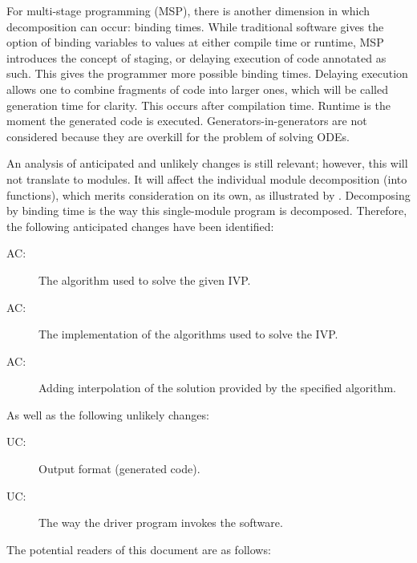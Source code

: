\documentclass[12pt, titlepage]{article}
\newcounter{acnum}
\newcommand{\actheacnum}{AC\theacnum}
\newcounter{ucnum}
\newcommand{\uctheucnum}{UC\theucnum}
\begin{document}
For multi-stage programming (MSP), there is another dimension in which 
decomposition can occur: binding times. While traditional software gives the 
option of binding variables to values at either compile time or runtime, MSP 
introduces the concept of staging, or delaying execution of code annotated as 
such. This gives the programmer more possible binding times. Delaying execution 
allows one to combine fragments of code into larger ones, which will be called 
generation time for clarity. This occurs after compilation time. Runtime is the 
moment the generated code is executed. Generators-in-generators are not 
considered because they are overkill for the problem of solving ODEs. 

An analysis of anticipated and unlikely changes is still relevant; however, 
this will not translate to modules. It will affect the individual module 
decomposition (into functions), which merits consideration on its 
own, as illustrated by \cite{VanHilst:1996:DCD:250707.239109}. Decomposing by 
binding time is the way this single-module program is decomposed. Therefore, 
the following anticipated changes have been identified:
\begin{description}
  \item[ \actheacnum \label{acAlgorithm}:] The algorithm 
  used to solve the given IVP.
  \item[ \actheacnum \label{acImplementation}:] The 
  implementation of the algorithms used to solve the IVP.
  \item [ \actheacnum \label{acInterpolation}:] Adding 
  interpolation of the solution provided by the specified algorithm.
\end{description}

As well as the following unlikely changes:
\begin{description}
  \item[ \uctheucnum \label{ucOutput}:] Output format 
  (generated code).
  \item[ \uctheucnum \label{ucInput}:] The way the driver 
  program invokes the software.
\end{description}

The potential readers of this document are as follows:
\end{document}
